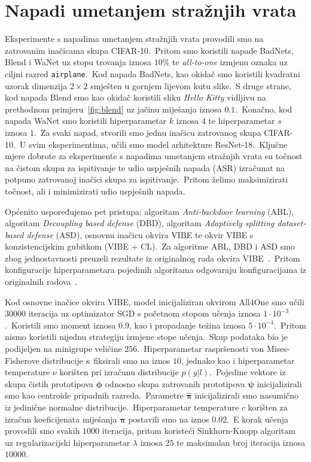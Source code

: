 \documentclass[diplomskirad]{fer}
\begin{document}
\section{Napadi umetanjem stražnjih vrata}
\label{sek:eksp_napadi}

Eksperimente s napadima umetanjem stražnjih vrata provodili smo na zatrovanim inačicama skupa CIFAR-10.\ 
Pritom smo koristili napade BadNets, Blend i WaNet uz stopu trovanja iznosa $10\%$ te \textit{all-to-one} izmjenu oznaka uz ciljni razred \texttt{airplane}.\ 
Kod napada BadNets, kao okidač smo koristili kvadratni uzorak dimenzija $2 \times 2$ smješten u gornjem lijevom kutu slike.\ 
S druge strane, kod napada Blend smo kao okidač koristili sliku \textit{Hello Kitty} vidljivu na prethodnom primjeru~\ref{fig:blend} uz jačinu miješanja iznosa $0.1$.\ 
Konačno, kod napada WaNet smo koristili hiperparametar $k$ iznosa $4$ te hiperparametar $s$ iznosa $1$.\
Za svaki napad, stvorili smo jednu inačicu zatrovanog skupa CIFAR-10.\ U svim eksperimentima, učili smo model arhitekture ResNet-18.\ 
Ključne mjere dobrote za eksperimente s napadima umetanjem stražnjih vrata su točnost na čistom skupu za ispitivanje te udio uspješnih napada (ASR) izračunat na potpuno zatrovanoj inačici skupa za ispitivanje.\ 
Pritom želimo maksimizirati točnost, ali i minimizirati udio uspješnih napada.\ 

Općenito uspoređujemo pet pristupa: algoritam \textit{Anti-backdoor learning} (ABL), algoritam \textit{Decoupling based defense} (DBD), algoritam \textit{Adaptively splitting dataset-based defense} (ASD), osnovnu inačicu okvira VIBE te okvir VIBE s konzistencijskim gubitkom (VIBE + CL).\ 
Za algoritme ABL, DBD i ASD smo zbog jednostavnosti preuzeli rezultate iz originalnog rada okvira VIBE~\cite{sabolic2025seal}.\ Pritom konfiguracije hiperparametara pojedinih algoritama odgovaraju konfiguracijama iz originalnih radova~\cite{li2021anti, huang2022backdoor, gao2023backdoor}.\ 

Kod osnovne inačice okvira VIBE, model inicijaliziran okvirom All4One smo učili $30000$ iteracija uz optimizator SGD s početnom stopom učenja iznosa $1 \cdot 10^{-3}$.\ Koristili smo moment iznosa $0.9$, kao i propadanje težina iznosa $5 \cdot 10^{-4}$.\ 
Pritom nismo koristili nijednu strategiju izmjene stope učenja.\ Skup podataka bio je podijeljen na minigrupe veličine $256$.\ 
Hiperparametar raspršenosti von Mises-Fisherove distribucije $\kappa$ fiksirali smo na iznos $10$, jednako kao i hiperparametar temperature $\nu$ korišten pri izračunu distribucije $p(y | l)$.\ 
Pojedine vektore iz skupa čistih prototipova $\bm{\phi}$ odnosno skupa zatrovanih prototipova $\bm{\psi}$ inicijalizirali smo kao centroide pripadnih razreda.\ Parametre $\bm{\hat{\pi}}$ inicijalizirali smo nasumično iz jedinične normalne distribucije.\ 
Hiperparametar temperature $c$ korišten za izračun koeficijenata miješanja $\bm{\pi}$ postavili smo na iznos $0.02$.\ E korak učenja provodili smo svakih $1000$ iteracija, pritom koristeći Sinkhorn-Knopp algoritam uz regularizacijski hiperparametar $\lambda$ iznosa $25$ te maksimalan broj iteracija iznosa $10 000$.\ 
\end{document}
